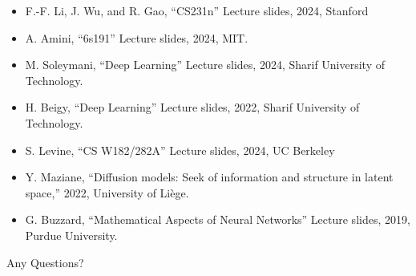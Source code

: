 \documentclass[serif, aspectratio=169]{beamer}
\begin{document}
\begin{frame}[allowframebreaks]
    
    
    \nocite{*} %
    \small
    \begin{itemize}
        \item F.-F. Li, J. Wu, and R. Gao, “CS231n” Lecture slides, 2024, Stanford 
        \item A. Amini, “6s191” Lecture slides, 2024, MIT. 
        \item M. Soleymani, “Deep Learning” Lecture slides, 2024, Sharif University of Technology.
        \item H. Beigy, “Deep Learning” Lecture slides, 2022, Sharif University of Technology.
        \item S. Levine, “CS W182/282A” Lecture slides, 2024, UC Berkeley 
        \item Y. Maziane, “Diffusion models: Seek of information and structure in latent space,” 2022, University of Liège.
        \item G. Buzzard, “Mathematical Aspects of Neural Networks” Lecture slides, 2019, Purdue University.
    \end{itemize}
\end{frame}


\begin{frame}
    \begin{center}
        {\Huge Any Questions?}
    \end{center}
\end{frame}
\end{document}
